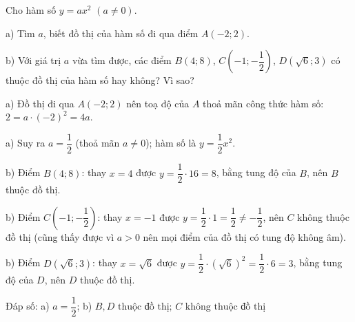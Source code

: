 \begin{problem}[9DS-HSB2-002]
Cho hàm số $y = ax^2$ $(a \neq 0)$.

a) Tìm $a$, biết đồ thị của hàm số đi qua điểm $A(-2; 2)$.

b) Với giá trị $a$ vừa tìm được, các điểm $B(4; 8)$, $C\left(-1; -\dfrac{1}{2}\right)$, $D\left(\sqrt{6}; 3\right)$ có thuộc đồ thị của hàm số hay không? Vì sao?

\begin{solution}
a) Đồ thị đi qua $A(-2; 2)$ nên toạ độ của $A$ thoả mãn công thức hàm số: $2 = a \cdot (-2)^2 = 4a$.

a) Suy ra $a = \dfrac{1}{2}$ (thoả mãn $a \neq 0$); hàm số là $y = \dfrac{1}{2}x^2$.

b) Điểm $B(4; 8)$: thay $x = 4$ được $y = \dfrac{1}{2} \cdot 16 = 8$, bằng tung độ của $B$, nên $B$ thuộc đồ thị.

b) Điểm $C\left(-1; -\dfrac{1}{2}\right)$: thay $x = -1$ được $y = \dfrac{1}{2} \cdot 1 = \dfrac{1}{2} \neq -\dfrac{1}{2}$, nên $C$ không thuộc đồ thị (cũng thấy được vì $a > 0$ nên mọi điểm của đồ thị có tung độ không âm).

b) Điểm $D\left(\sqrt{6}; 3\right)$: thay $x = \sqrt{6}$ được $y = \dfrac{1}{2} \cdot \left(\sqrt{6}\right)^2 = \dfrac{1}{2} \cdot 6 = 3$, bằng tung độ của $D$, nên $D$ thuộc đồ thị.

Đáp số: a) $\boxed{a = \dfrac{1}{2}}$; b) $\boxed{B, D \text{ thuộc đồ thị; } C \text{ không thuộc đồ thị}}$
\end{solution}
\end{problem}

